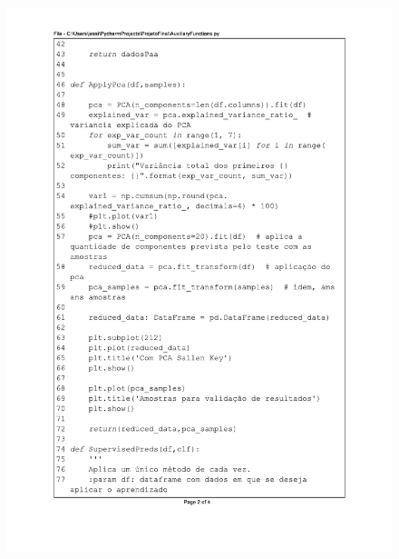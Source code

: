 \begin{figure}[H]
\centering
\includegraphics[scale=0.9]{01_Pre_textuais/code/analisa2.pdf}
\end{figure}
